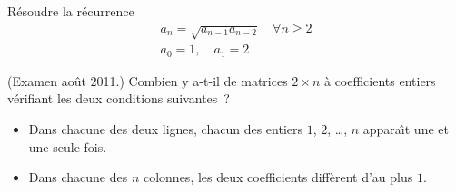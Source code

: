 
\begin{exo}
R\'esoudre la r\'ecurrence
$$
\begin{array}{l}
a_n = \sqrt{a_{n-1} a_{n-2}} \quad \forall n \geqslant 2\\
a_0 = 1, \quad a_1 = 2
\end{array}
$$
\end{exo}


\begin{exo} (Examen ao\^ut 2011.)
Combien y a-t-il de matrices $2 \times n$ \`a coefficients entiers v\'erifiant les deux conditions suivantes~?
%
\begin{itemize}
\item Dans chacune des deux lignes, chacun des entiers $1$, $2$, \ldots, $n$ appara\^\i{}t une et une seule fois.
\item Dans chacune des $n$ colonnes, les deux coefficients diff\`erent d'au plus $1$.
\end{itemize}
\end{exo}